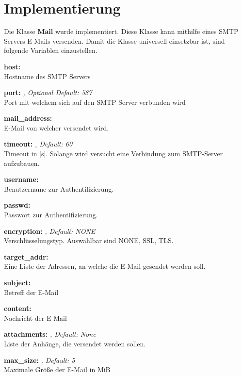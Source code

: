 \chapter{Implementierung}

Die Klasse \textbf{Mail} wurde implementiert. Diese Klasse kann mithilfe eines \ac{SMTP} Servers E-Mails versenden. Damit die Klasse universell einsetzbar ist, sind folgende Variablen einzustellen.

\begin{addmargin}[20pt]{0pt}
	
	\textbf{host:} \textit{}\\
	\tab Hostname des SMTP Servers
	
	\textbf{port:} \textit{, Optional Default: 587}\\
	\tab Port mit welchem sich auf den SMTP Server verbunden wird
	
	\textbf{mail\_address:} \textit{}\\
	\tab E-Mail von welcher versendet wird.
	
	\textbf{timeout:} \textit{, Default: 60}\\
	\tab Timeout in [s]. Solange wird versucht eine Verbindung zum SMTP-Server aufzubauen.
	
	\textbf{username:} \textit{}\\
	\tab Benutzername zur Authentifizierung.
	
	\textbf{passwd:} \textit{}\\
	\tab Passwort zur Authentifizierung.
	
	\textbf{encryption:} \textit{, Default: NONE}\\
	\tab Verschlüsselungstyp. Auswählbar sind NONE, SSL, TLS.
	
	\textbf{target\_addr:} \textit{}\\
	\tab Eine Liste der Adressen, an welche die E-Mail gesendet werden soll.
	
	\textbf{subject:} \textit{}\\
	\tab Betreff der E-Mail
	
	\textbf{content:} \textit{}\\
	\tab Nachricht der E-Mail
	
	\textbf{attachments:} \textit{, Default: None}\\
	\tab Liste der Anhänge, die versendet werden sollen.
	
	\textbf{max\_size:} \textit{, Default: 5}\\
	\tab Maximale Größe der E-Mail in MiB

\end{addmargin}

